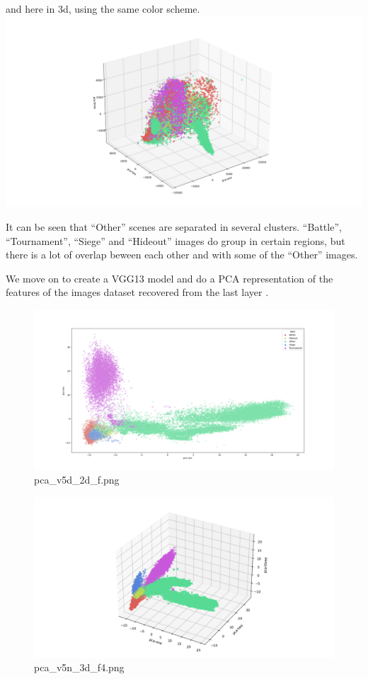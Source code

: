 \documentclass[
]{article}
\begin{document}
and here in 3d, using the same color scheme.
\includegraphics{visualizations/pca_sklearn_3d_80_45_L.png}

It can be seen that ``Other'' scenes are separated in several clusters.
``Battle'', ``Tournament'', ``Siege'' and ``Hideout'' images do group in
certain regions, but there is a lot of overlap beween each other and
with some of the ``Other'' images.

We move on to create a VGG13 model and do a PCA representation of the
features of the images dataset recovered from the last layer .

\begin{figure}
\centering
\includegraphics{visualizations/pca_v5n_2d_f.png}
\caption{pca\_v5d\_2d\_f.png}
\end{figure}

\begin{figure}
\centering
\includegraphics{visualizations/pca_v5n_3d_f4.png}
\caption{pca\_v5n\_3d\_f4.png}
\end{figure}
\end{document}
